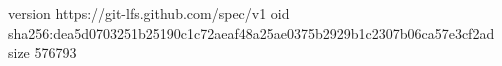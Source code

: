 version https://git-lfs.github.com/spec/v1
oid sha256:dea5d0703251b25190c1c72aeaf48a25ae0375b2929b1c2307b06ca57e3cf2ad
size 576793
